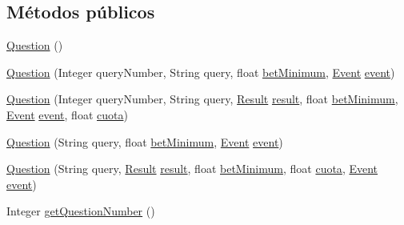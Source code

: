 \subsection*{Métodos públicos}
\begin{DoxyCompactItemize}
\item 
\mbox{\hyperlink{classdomain_1_1Question_ad025aa3764e207e64c6f5b5e09976af3}{Question}} ()
\item 
\mbox{\hyperlink{classdomain_1_1Question_ac026fc0206761497b2b1827a1b4ff1ce}{Question}} (Integer query\+Number, String query, float \mbox{\hyperlink{classdomain_1_1Question_a24ff305bdbaca1ac5ea5263f8f9be7d2}{bet\+Minimum}}, \mbox{\hyperlink{classdomain_1_1Event}{Event}} \mbox{\hyperlink{classdomain_1_1Question_a375d8735a06d8a8b12fe643bb31f4c14}{event}})
\item 
\mbox{\hyperlink{classdomain_1_1Question_a724bb2ee772f7f1050ddbed1a4b6bd74}{Question}} (Integer query\+Number, String query, \mbox{\hyperlink{classdomain_1_1Result}{Result}} \mbox{\hyperlink{classdomain_1_1Question_a74d098c940c1c91c8f37fd9288ebd3d3}{result}}, float \mbox{\hyperlink{classdomain_1_1Question_a24ff305bdbaca1ac5ea5263f8f9be7d2}{bet\+Minimum}}, \mbox{\hyperlink{classdomain_1_1Event}{Event}} \mbox{\hyperlink{classdomain_1_1Question_a375d8735a06d8a8b12fe643bb31f4c14}{event}}, float \mbox{\hyperlink{classdomain_1_1Question_a532249286ab9f5f211a030892bcd6756}{cuota}})
\item 
\mbox{\hyperlink{classdomain_1_1Question_a3e1f15538bc3f7b204e0e80cf9079d6d}{Question}} (String query, float \mbox{\hyperlink{classdomain_1_1Question_a24ff305bdbaca1ac5ea5263f8f9be7d2}{bet\+Minimum}}, \mbox{\hyperlink{classdomain_1_1Event}{Event}} \mbox{\hyperlink{classdomain_1_1Question_a375d8735a06d8a8b12fe643bb31f4c14}{event}})
\item 
\mbox{\hyperlink{classdomain_1_1Question_a92286f88946d50c5dfb61ce54c155462}{Question}} (String query, \mbox{\hyperlink{classdomain_1_1Result}{Result}} \mbox{\hyperlink{classdomain_1_1Question_a74d098c940c1c91c8f37fd9288ebd3d3}{result}}, float \mbox{\hyperlink{classdomain_1_1Question_a24ff305bdbaca1ac5ea5263f8f9be7d2}{bet\+Minimum}}, float \mbox{\hyperlink{classdomain_1_1Question_a532249286ab9f5f211a030892bcd6756}{cuota}}, \mbox{\hyperlink{classdomain_1_1Event}{Event}} \mbox{\hyperlink{classdomain_1_1Question_a375d8735a06d8a8b12fe643bb31f4c14}{event}})
\item 
Integer \mbox{\hyperlink{classdomain_1_1Question_a5d70fcb8f2e33df7bf9f64114ec18d50}{get\+Question\+Number}} ()
\item 

\end{DoxyCompactItemize}
